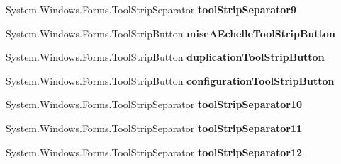 \begin{DoxyCompactItemize}
\item 
System.\+Windows.\+Forms.\+Tool\+Strip\+Separator {\bfseries tool\+Strip\+Separator9}\hypertarget{class_interface_graphique_1_1_edition_a95ace53be0c5a1539571d620155b1f9f}{}\label{class_interface_graphique_1_1_edition_a95ace53be0c5a1539571d620155b1f9f}

\item 
System.\+Windows.\+Forms.\+Tool\+Strip\+Button {\bfseries mise\+A\+Echelle\+Tool\+Strip\+Button}\hypertarget{class_interface_graphique_1_1_edition_a34801c09577e0c71879bbbf65a967813}{}\label{class_interface_graphique_1_1_edition_a34801c09577e0c71879bbbf65a967813}

\item 
System.\+Windows.\+Forms.\+Tool\+Strip\+Button {\bfseries duplication\+Tool\+Strip\+Button}\hypertarget{class_interface_graphique_1_1_edition_a20f95ac74412ecb1ab7c7352ac5d4dc0}{}\label{class_interface_graphique_1_1_edition_a20f95ac74412ecb1ab7c7352ac5d4dc0}

\item 
System.\+Windows.\+Forms.\+Tool\+Strip\+Button {\bfseries configuration\+Tool\+Strip\+Button}\hypertarget{class_interface_graphique_1_1_edition_a922758386c39718fec140f2ae110d696}{}\label{class_interface_graphique_1_1_edition_a922758386c39718fec140f2ae110d696}

\item 
System.\+Windows.\+Forms.\+Tool\+Strip\+Separator {\bfseries tool\+Strip\+Separator10}\hypertarget{class_interface_graphique_1_1_edition_a8e8824f3e60ae9c3a30cd0d3c35246ab}{}\label{class_interface_graphique_1_1_edition_a8e8824f3e60ae9c3a30cd0d3c35246ab}

\item 
System.\+Windows.\+Forms.\+Tool\+Strip\+Separator {\bfseries tool\+Strip\+Separator11}\hypertarget{class_interface_graphique_1_1_edition_ad72e03bd3fef657998e630508cacc54f}{}\label{class_interface_graphique_1_1_edition_ad72e03bd3fef657998e630508cacc54f}

\item 
System.\+Windows.\+Forms.\+Tool\+Strip\+Separator {\bfseries tool\+Strip\+Separator12}\hypertarget{class_interface_graphique_1_1_edition_a171500a1f8608a1018184aade3d1a262}{}\label{class_interface_graphique_1_1_edition_a171500a1f8608a1018184aade3d1a262}

\end{DoxyCompactItemize}
